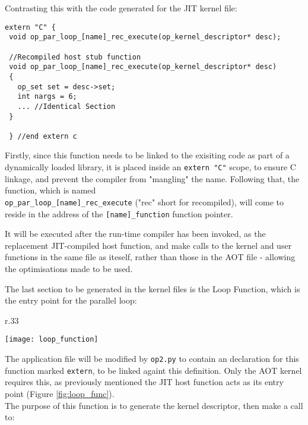 Contrasting this with the code generated for the JIT kernel file:

\begin{lstlisting}[linewidth = \textwidth, framesep=0pt, linebackgroundcolor={\ifnum\value{lstnumber}=9\color{red!20} \else \color{green!20} \fi}]
 extern "C" {
 void op_par_loop_[name]_rec_execute(op_kernel_descriptor* desc);

 //Recompiled host stub function
 void op_par_loop_[name]_rec_execute(op_kernel_descriptor* desc)
 {
   op_set set = desc->set;
   int nargs = 6;
   ... //Identical Section
 }

 } //end extern c
\end{lstlisting}
\vspace{-1em}

Firstly, since this function needs to be linked to the exisiting code as part of a dynamically loaded library, it is placed inside an \verb|extern "C"| scope, to ensure C linkage, and prevent the compiler from "mangling" the name. Following that, the function, which is named\\
\verb|op_par_loop_[name]_rec_execute| ("rec" short for recompiled), will come to reside in the address of the \verb|[name]_function| function pointer.
\par
It will be executed after the run-time compiler has been invoked, as the replacement JIT-compiled host function, and make calls to the kernel and user functions in the same file as iteself, rather than those in the AOT file - allowing the optimisations made to be used.

The last section to be generated in the kernel files is the Loop Function, which is the entry point for the parallel loop:

\begin{wrapfigure}[12]{r}{.33\textwidth}
  \vspace{-3em}
  \centering
  \caption{Loop Function}
  \label{fig:loop_func}
  \texttt{[image: loop\_function]}
\end{wrapfigure}
The application file will be modified by \verb|op2.py| to contain an declaration for this function marked \verb|extern|, to be linked againt this definition. Only the AOT kernel requires this, as previously mentioned the JIT host function acts as its entry point (Figure \ref{fig:loop_func}).
\\
The purpose of this function is to generate the kernel descriptor, then make a call to:

